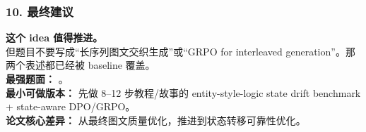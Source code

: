\subsubsection*{10. 最终建议}

\begin{conceptbox}
\textbf{这个 idea 值得推进。}\\
但题目不要写成“长序列图文交织生成”或“GRPO for interleaved generation”。那两个表述都已经被 baseline 覆盖。\\
\textbf{最强题面：} 。\\
\textbf{最小可做版本：} 先做 8--12 步教程/故事的 entity-style-logic state drift benchmark + state-aware DPO/GRPO。\\
\textbf{论文核心差异：} 从最终图文质量优化，推进到状态转移可靠性优化。
\end{conceptbox}
